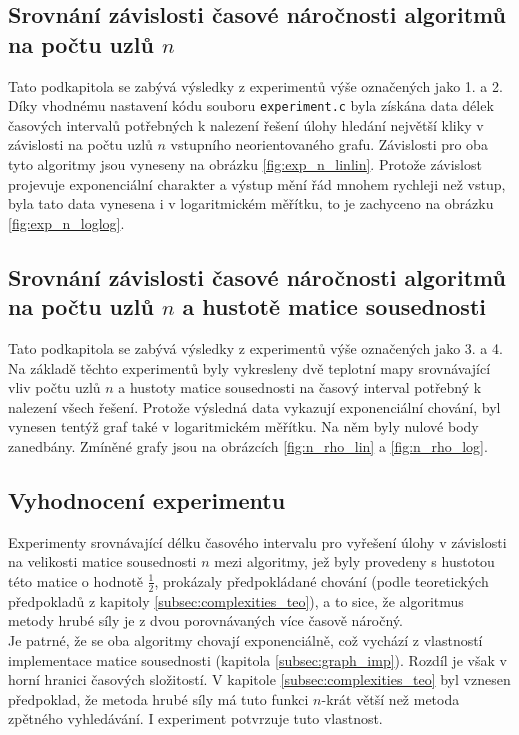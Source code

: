 \documentclass[a4paper]{article}
\begin{document}
    \subsection{Srovnání závislosti časové náročnosti algoritmů na počtu uzlů $n$}
        Tato podkapitola se zabývá výsledky z experimentů výše označených jako 1. a 2. Díky vhodnému nastavení kódu souboru \lstinline{experiment.c} byla získána data délek časových intervalů potřebných k nalezení řešení úlohy hledání největší kliky v závislosti na počtu uzlů $n$ vstupního neorientovaného grafu. Závislosti pro oba tyto algoritmy jsou vyneseny na obrázku \ref{fig:exp_n_linlin}. Protože závislost projevuje exponenciální charakter a výstup mění řád mnohem rychleji než vstup, byla tato data vynesena i v logaritmickém měřítku, to je zachyceno na obrázku \ref{fig:exp_n_loglog}.

    \subsection{Srovnání závislosti časové náročnosti algoritmů na počtu uzlů $n$ a hustotě matice sousednosti}
        Tato podkapitola se zabývá výsledky z experimentů výše označených jako 3. a 4. Na základě těchto experimentů byly vykresleny dvě teplotní mapy srovnávající vliv počtu uzlů $n$ a hustoty matice sousednosti na časový interval potřebný k nalezení všech řešení. Protože výsledná data vykazují exponenciální chování, byl vynesen tentýž graf také v logaritmickém měřítku. Na něm byly nulové body zanedbány. Zmíněné grafy jsou na obrázcích \ref{fig:n_rho_lin} a \ref{fig:n_rho_log}.

    \subsection{Vyhodnocení experimentu}
        Experimenty srovnávající délku časového intervalu pro vyřešení úlohy v závislosti na velikosti matice sousednosti $n$ mezi algoritmy, jež byly provedeny s hustotou této matice o hodnotě $\frac{1}{2}$, prokázaly předpokládané chování (podle teoretických předpokladů z kapitoly \ref{subsec:complexities_teo}), a to sice, že algoritmus metody hrubé síly je z dvou porovnávaných více časově náročný.\\
        
        \noindent
        Je patrné, že se oba algoritmy chovají exponenciálně, což vychází z vlastností implementace matice sousednosti (kapitola \ref{subsec:graph_imp}). Rozdíl je však v horní hranici časových složitostí. V kapitole \ref{subsec:complexities_teo} byl vznesen předpoklad, že metoda hrubé síly má tuto funkci $n$-krát větší než metoda zpětného vyhledávání. I experiment potvrzuje tuto vlastnost.\\
\end{document}
